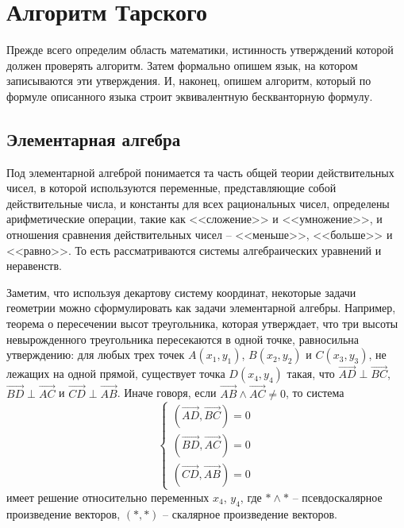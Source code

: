 \section{Алгоритм Тарского}

Прежде всего определим область математики, истинность утверждений которой должен проверять алгоритм. Затем формально опишем язык, на котором записываются эти утверждения. И, наконец, опишем алгоритм, который по формуле описанного языка строит эквивалентную бескванторную формулу.

\subsection{Элементарная алгебра}

Под элементарной алгеброй понимается та часть общей теории действительных чисел, в которой используются переменные, представляющие собой действительные числа, и константы для всех рациональных чисел, определены арифметические операции, такие как <<сложение>> и <<умножение>>, и отношения сравнения действительных чисел -- <<меньше>>, <<больше>> и <<равно>>. То есть рассматриваются системы алгебраических уравнений и неравенств.

Заметим, что используя декартову систему координат, некоторые задачи геометрии можно сформулировать как задачи элементарной алгебры. Например, теорема о пересечении высот треугольника, которая утверждает, что три высоты невырожденного треугольника пересекаются в одной точке, равносильна утверждению: для любых трех точек $A(x_1, y_1)$, $B(x_2, y_2)$ и $C(x_3, y_3)$, не лежащих на одной прямой, существует точка $D(x_4, y_4)$ такая, что $\overrightarrow{AD} \perp \overrightarrow{BC}$, $\overrightarrow{BD} \perp \overrightarrow{AC}$ и $\overrightarrow{CD} \perp \overrightarrow{AB}$. Иначе говоря, если $\overrightarrow{AB} \land \overrightarrow{AC} \neq 0$, то система
\begin{equation*}
    \begin{cases}
        \left(\overrightarrow{AD}, \overrightarrow{BC}\right) = 0 \\
        \left(\overrightarrow{BD}, \overrightarrow{AC}\right) = 0 \\
        \left(\overrightarrow{CD}, \overrightarrow{AB}\right) = 0
    \end{cases}
\end{equation*}
имеет решение относительно переменных $x_4$, $y_4$, где $* \land *$ -- псевдоскалярное произведение векторов, $(*, *)$ -- скалярное произведение векторов.

